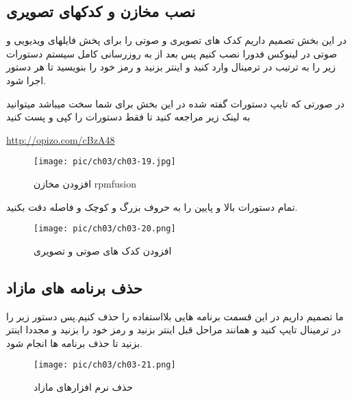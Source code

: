 \subsection{نصب مخازن و کدکهای تصویری} \label{se-233}
در این بخش تصمیم داریم کدک های تصویری و صوتی را برای پخش فایلهای ویدیویی و صوتی در لینوکس فدورا نصب کنیم پس بعد از به روزرسانی کامل سیستم دستورات زیر را به ترتیب در ترمینال وارد کنید و اینتر بزنید و رمز خود را بنویسید تا هر دستور اجرا شود.
\begin{tcolorbox}[title=نصب مخازن و کدک صوتی و تصویری]
	در صورتی که تایپ دستورات گفته شده در این بخش برای شما سخت میباشد میتوانید به لینک زیر مراجعه کنید تا فقط دستورات را کپی و پست کنید
	\begin{flushleft}
		\href{http://www.linuxfedora.ir/viewtopic.php?f=9\&t=92}{http://opizo.com/cBzA48}
	\end{flushleft}
\end{tcolorbox}
\begin{figure}[H]%
	\caption{افزودن مخازن rpmfusion}
	\begin{center}
		\texttt{[image: pic/ch03/ch03-19.jpg]}
	\end{center}
	\label{pic-27}
\end{figure}
تمام دستورات بالا و پایین را به حروف بزرگ و کوچک و فاصله دقت بکنید.
\begin{figure}[H]%
	\caption{افزودن کدک های صوتی و تصویری}
	\begin{center}
		\texttt{[image: pic/ch03/ch03-20.png]}
	\end{center}
	\label{pic-28}
\end{figure}
\subsection{حذف برنامه های مازاد}\label{se-234}
ما تصمیم داریم در این قسمت برنامه هایی بلااستفاده را حذف کنیم.پس دستور زیر را در ترمینال تایپ کنید و همانند مراحل قبل اینتر بزنید و رمز خود را بزنید و مجددا اینتر بزنید تا حذف برنامه ها انجام شود.
\begin{figure}[H]%
	\caption{حذف نرم افزارهای مازاد}
	\begin{center}
		\texttt{[image: pic/ch03/ch03-21.png]}
	\end{center}
	\label{pic-29}
\end{figure}
